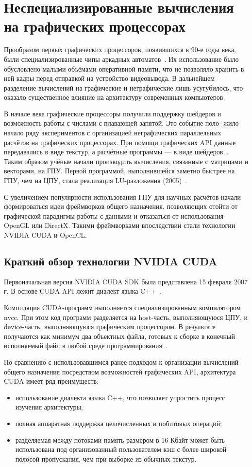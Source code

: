\section{Неспециализированные вычисления на графических процессорах}

Прообразом первых графических процессоров, появившихся в 90-е годы
 века, были специализированные чипы аркадных автоматов~\cite{enwiki:gpu}. Их использование было обусловлено малыми объёмами оперативной памяти, что не позволяло хранить в ней кадры перед отправкой на устройство видеовывода. В
дальнейшем разделение вычислений на графические и неграфические лишь
усугубилось, что оказало существенное влияние на архитектуру современных
компьютеров.

В начале  века графические процессоры получили поддержку шейдеров и возможность работы с числами с плавающей запятой. Это событие поло-
жило начало ряду экспериментов с организацией неграфических параллельных
расчётов на графических процессорах. При помощи графических API данные
передавались в виде текстур, а расчётные программы --- в виде шейдеров~\cite{Berillo}.
Таким образом учёные начали производить вычисления, связанные с матрицами и векторами, на ГПУ. Первой программой, выполнившейся заметно быстрее
на ГПУ, чем на ЦПУ, стала реализация LU-разложения (2005)~\cite{LU-GPU}.

С увеличением популярности использования ГПУ для научных расчётов
начали формироваться идеи фреймворков общего назначения, позволяющих
отойти от графической парадигмы работы с данными и отказаться от использования OpenGL или DirectX. Такими фреймворками впоследствии стали технологии NVIDIA CUDA и OpenCL.

\subsection{Краткий обзор технологии NVIDIA CUDA}

Первоначальная версия NVIDIA CUDA SDK была представлена 15 февраля 2007 г.
В основе CUDA API лежит диалект языка C++~\cite{enwiki:CUDA}.

Компиляция CUDA-программ выполняется специализированным компилятором nvcc. При этом код программ разделяется на host-часть, выполняющуюся ЦПУ, и device-часть, выполняющуюся графическим процессором. В результате получаются как минимум два объектных файла, готовых к сборке в
конечный исполняемый файл в любой среде программирования~\cite{CUDAToolkitDocumentation}.

По сравнению с использовавшимся ранее подходом к организации вычислений общего назначения посредством возможностей графических API, архитектура CUDA имеет ряд преимуществ:
\begin{itemize}
\item использование диалекта языка C++, что позволяет упростить процесс изучения архитектуры;
\item  полная аппаратная поддержка целочисленных и побитовых операций;
\item  разделяемая между потоками память размером в 16 Кбайт может быть
использована под организованный пользователем кэш с более широкой полосой пропускания, чем при выборке из обычных текстур.
\end{itemize}


